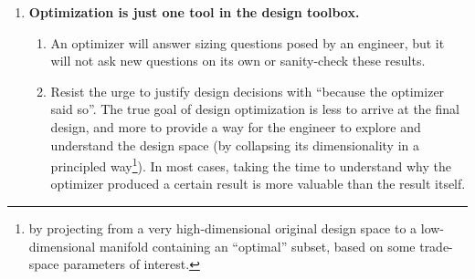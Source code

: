 \begin{enumerate}
    \begin{enumerate}
        \item Resist the tendency to build a large design tool from the start ``in one fell swoop'', without testing the code along the way. Doing so makes it enormously difficult to debug when the problem formulation is inevitably found to be flawed. Instead, build a simple minimum-viable design tool first, where the only constraints are high-level design closure\footnote{Usually, this involves weight/lift, thrust/drag, and power closures.}. (In other words, start by just performing basic napkin-math sizing, not optimization.) Then, add new variables, constraints, and analyses incrementally, testing the code with each new feature.
        \item Use a version control system (e.g., Git) to track this iterative development of the problem formulation. This allows rapid identification of when and where a mistake was introduced.
    \end{enumerate}
    \item \textbf{Optimization is just one tool in the design toolbox.}
    \begin{enumerate}
        \item An optimizer will answer sizing questions posed by an engineer, but it will not ask new questions on its own or sanity-check these results.
        \item Resist the urge to justify design decisions with ``because the optimizer said so''. The true goal of design optimization is less to arrive at the final design, and more to provide a way for the engineer to explore and understand the design space (by collapsing its dimensionality in a principled way\footnote{by projecting from a very high-dimensional original design space to a low-dimensional manifold containing an ``optimal'' subset, based on some trade-space parameters of interest.}). In most cases, taking the time to understand why the optimizer produced a certain result is more valuable than the result itself.
    \end{enumerate}
\end{enumerate}